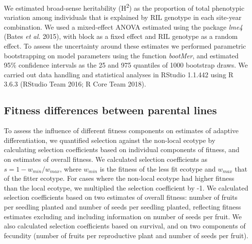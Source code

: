 \documentclass[12pt,]{article}
\begin{document}
We estimated broad-sense heritability (H\textsuperscript{2}) as the proportion of total phenotypic variation among individuals that is explained by RIL genotype in each site-year combination. We used a mixed-effect ANOVA estimated using the package \emph{lme4} (Bates \emph{et al.} 2015), with block as a fixed effect and RIL genotype as a random effect. To assess the uncertainty around these estimates we performed parametric bootstrapping on model parameters using the function \emph{bootMer}, and estimated 95\% confidence intervals as the 25 and 975 quantiles of 1000 bootstrap draws. We carried out data handling and statistical analyses in RStudio 1.1.442 using R 3.6.3 (RStudio Team 2016; R Core Team 2018).

\hypertarget{fitness-differences-between-parental-lines}{%
\subsection{Fitness differences between parental lines}\label{fitness-differences-between-parental-lines}}

To assess the influence of different fitness components on estimates of adaptive differentiation, we quantified selection against the non-local ecotype by calculating selection coefficients based on individual components of fitness, and on estimates of overall fitness. We calculated selection coefficients as \(s=1-w_{min}/w_{max}\), where \(w_{min}\) is the fitness of the less fit ecotype and \(w_{max}\) that of the fitter ecotype. For cases where the non-local ecotype had higher fitness than the local ecotype, we multiplied the selection coefficient by -1. We calculated selection coefficients based on two estimates of overall fitness: number of fruits per seedling planted and number of seeds per seedling planted, reflecting fitness estimates excluding and including information on number of seeds per fruit. We also calculated selection coefficients based on survival, and on two components of fecundity (number of fruits per reproductive plant and number of seeds per fruit).
\end{document}
